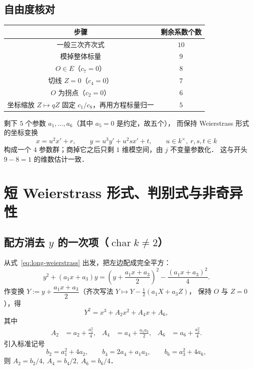 \documentclass[10pt,a4paper]{article}
\numberwithin{equation}{section}
\begin{document}
\subsection{自由度核对}

\begin{center}
\begin{tabular}{c|c}
\hline
步骤 & 剩余系数个数\\
\hline
一般三次齐次式 & $10$\\
模掉整体标量 & $9$\\
$O\in E$（$c_{7}=0$） & $8$\\
切线 $Z=0$（$c_{4}=0$） & $7$\\
$O$ 为拐点（$c_{2}=0$） & $6$\\
坐标缩放 $Z\mapsto qZ$ 固定 $c_{1}/c_{8}$，再用方程标量归一 & $5$\\
\hline
\end{tabular}
\end{center}

剩下 $5$ 个参数 $a_{1},\dots,a_{6}$（其中 $a_{5}=0$ 是约定，故五个），
而保持 Weierstrass 形式的坐标变换
\[
x=u^{2}x'+r,\qquad y=u^{3}y'+u^{2}sx'+t,\qquad u\in k^{\times},\ r,s,t\in k
\]
构成一个 $4$ 参数群；商掉它之后只剩 $1$ 维模空间，由 $j$ 不变量参数化．
这与开头 $9-8=1$ 的维数估计一致．

\section{短 Weierstrass 形式、判别式与非奇异性}\label{sec:short-form}

\subsection{配方消去 $y$ 的一次项（$\operatorname{char}k\neq2$）}

从式~\eqref{eq:long-weierstrass} 出发，把左边配成完全平方：
\[
y^{2}+(a_{1}x+a_{3})y
=\left(y+\frac{a_{1}x+a_{3}}{2}\right)^{2}-\frac{(a_{1}x+a_{3})^{2}}{4}.
\]
作变换 $Y:=y+\dfrac{a_{1}x+a_{3}}{2}$（齐次写法 $Y\mapsto Y-\tfrac{1}{2}(a_{1}X+a_{3}Z)$，
保持 $O$ 与 $Z=0$），得
\begin{equation}\label{eq:after-square}
Y^{2}=x^{3}+A_{2}x^{2}+A_{4}x+A_{6},
\end{equation}
其中
\begin{align}
A_{2}&=a_{2}+\frac{a_{1}^{2}}{4}, &
A_{4}&=a_{4}+\frac{a_{1}a_{3}}{2}, &
A_{6}&=a_{6}+\frac{a_{3}^{2}}{4}.
\end{align}
引入标准记号
\begin{equation}\label{eq:b-invariants}
b_{2}=a_{1}^{2}+4a_{2},\qquad b_{4}=2a_{4}+a_{1}a_{3},\qquad
b_{6}=a_{3}^{2}+4a_{6},
\end{equation}
则 $A_{2}=b_{2}/4,\ A_{4}=b_{4}/2,\ A_{6}=b_{6}/4$．
\end{document}
